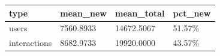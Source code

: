 \begin{tabular}{llll}
\toprule
type & mean_new & mean_total & pct_new \\
\midrule
users & 7560.8933 & 14672.5067 & 51.57\% \\
interactions & 8682.9733 & 19920.0000 & 43.57\% \\
\bottomrule
\end{tabular}
